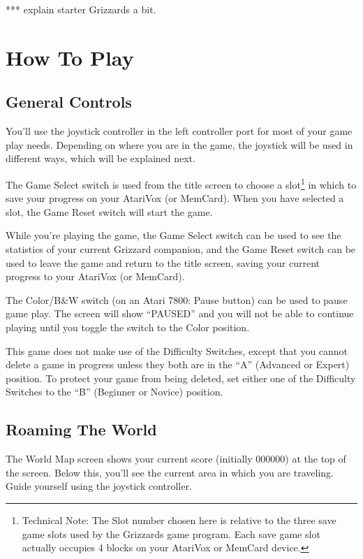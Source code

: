 \documentclass[10pt,twoside,openright]{memoir}
\begin{document}
*** explain starter Grizzards a bit.


\chapter{How To Play}

\section{General Controls}

You'll use the joystick controller in the left controller port for most of
your game play needs. Depending on where you are in the game, the joystick
will be used in different ways, which will be explained next.

The  Game  Select  switch  is  used from  the  title  screen  to  choose
a slot\footnote{Technical Note: The Slot  number chosen here is relative
  to  the three  save game  slots used  by the  Grizzards game  program.
  Each save  game slot actually  occupies 4  blocks on your  AtariVox or
  MemCard device.} in  which to save your progress on  your AtariVox (or
MemCard). When  you have  selected a  slot, the  Game Reset  switch will
start the game.

While you're playing the game, the Game Select switch can be used to see the
statistics of your current Grizzard companion, and the Game Reset switch can
be used to leave the game and return to the title screen, saving your
current progress to your AtariVox (or MemCard).

The Color/B\&W switch (on an Atari 7800: Pause button) can be used to pause
game play. The screen will show ``PAUSED'' and you will not be able to
continue playing until you toggle the switch to the Color position.

This game does not make use  of the Difficulty Switches, except that you
cannot  delete a  game in  progress unless  they both  are in  the ``A''
(Advanced or Expert) position. To  protect your game from being deleted,
set either  one of  the Difficulty  Switches to  the ``B''  (Beginner or
Novice) position.


\section{Roaming The World}

The World Map screen shows your  current score (initially 000000) at the
top of the screen. Below this, you'll  see the current area in which you
are traveling. Guide yourself using the joystick controller.
\end{document}
